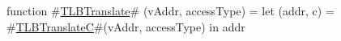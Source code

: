 function #\hyperref[zTLBTranslate]{TLBTranslate}# (vAddr, accessType) = 
      let (addr, c) = #\hyperref[zTLBTranslateC]{TLBTranslateC}#(vAddr, accessType) in addr
